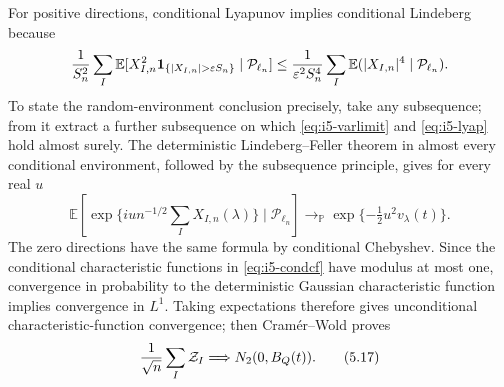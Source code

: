 \documentclass[11pt]{article}
\numberwithin{equation}{section}
\newcommand{\1}{\mathbf 1}\newcommand{\F}{\mathcal F}\newcommand{\D}{\mathcal D}
\begin{document}
For positive directions, conditional Lyapunov implies conditional Lindeberg
because
\[
 {1\over S_n^2}\sum_I\mathbb E[X_{I,n}^2{\bf1}_{\{|X_{I,n}|>\varepsilon S_n\}}
 \mid\mathcal P_{\ell_n}]
 \le{1\over\varepsilon^2S_n^4}\sum_I\mathbb E(|X_{I,n}|^4\mid\mathcal P_{\ell_n}).
\]
To state the random-environment conclusion precisely, take any subsequence;
from it extract a further subsequence on which \eqref{eq:i5-varlimit} and
\eqref{eq:i5-lyap} hold almost surely.  The deterministic Lindeberg--Feller
theorem in almost every conditional environment, followed by the subsequence
principle, gives for every real $u$
\begin{equation}
 \mathbb E\!\left[\exp\{iu n^{-1/2}\sum_IX_{I,n}(\lambda)\}
       \mid\mathcal P_{\ell_n}\right]
 \longrightarrow_{\mathbb P}\exp\{-\tfrac12u^2v_\lambda(t)\}.   \tag{5.16}\label{eq:i5-condcf}
\end{equation}
The zero directions have the same formula by conditional Chebyshev.  Since
the conditional characteristic functions in \eqref{eq:i5-condcf} have modulus
at most one, convergence in probability to the deterministic Gaussian
characteristic function implies convergence in $L^1$.  Taking expectations
therefore gives unconditional characteristic-function convergence; then
Cram\'er--Wold proves
\begin{equation}
 {1\over\sqrt n}\sum_I\mathcal Z_I\Longrightarrow N_2(0,B_Q(t)). \tag{5.17}\label{eq:i5-blockclt}
\end{equation}
\end{document}
